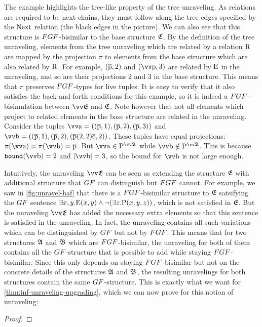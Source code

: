 \noindent
The example highlights the tree-like property of the tree unraveling.
As relations are required to be next-chains, they must follow along the tree edges specified by the $\mathrm{Next}$ relation (the black edges in the picture).
We can also see that this structure is $\FGF$-bisimilar to the base structure ${\mathfrak{E}}$.
By the definition of the tree unraveling, elements from the tree unraveling which are related by a relation $\mathrm{R}$ are mapped by the projection $\pi$ to elements from the base structure which are also related by $\mathrm{R}$.
For example, $(\overline{\mathrm{p}}, 2)$ and $(\elemtuptuplep, 3)$ are related by $\mathrm{E}$ in the unraveling, and so are their projections $2$ and $3$ in the base structure.
This means that $\pi$ preserves $\FGF$-types for live tuples.
It is easy to verify that it also satisfies the back-and-forth conditions for this example, so it is indeed a $\FGF$-bisimulation between $\unravel{E}$ and ${\mathfrak{E}}$.
Note however that not all elements which project to related elements in the base structure are related in the unraveling.
Consider the tuples $\elemtuptuplea = ((\elemtuplep, 1), (\elemtuplep, 2), (\elemtuplep, 3))$ and $\elemtuptupleb = ((\elemtuplep, 1), (\elemtuplep, 2), (\elemtuplep(2,2)\elemtuplee, 2))$.
These tuples have equal projections: $\pi(\elemtuptuplea) = \pi(\elemtuptupleb) = \elemtuplep$.
But $\elemtuptuplea \in \relP^{\unravel{A}}$ while $\elemtuptupleb \notin \relP^{\unravel{A}}$.
This is because $\mathtt{bound}(\elemtuptupleb) = 2$ and $|\elemtuptupleb| = 3$, so the bound for $\elemtuptupleb$ is not large enough.

Intuitively, the unraveling $\unravel{E}$ can be seen as extending the structure ${\mathfrak{E}}$ with additional structure that $\GF$ can distinguish but $\FGF$ cannot.
For example, we saw in \cref{fig:unravel-haf} that there is a $\FGF$-bisimilar structure to ${\mathfrak{E}}$ satsifying the $\GF$ sentence $\exists{x,y}. \mathrm{E}(x,y) \land \lnot (\exists z. \mathrm{P}(x,y,z))$, which is not satisfied in ${\mathfrak{E}}$.
But the unraveling $\unravel{E}$ has added the necessary extra elements so that this sentence is satisfied in the unraveling.
In fact, the unraveling contains all such variations which can be distinguished by $\GF$ but not by $\FGF$.
This means that for two structures ${\mathfrak{A}}$ and ${\mathfrak{B}}$ which are $\FGF$-bisimilar, the unraveling for both of them contains all the $\GF$-structure that is possible to add while staying $\FGF$-bisimilar.
Since this only depends on staying $\FGF$-bisimilar but not on the concrete details of the structures ${\mathfrak{A}}$ and ${\mathfrak{B}}$, the resulting unravelings for both structures contain the same $\GF$-structure.
This is exactly what we want for \cref{thm:inf-unraveling-upgrading}, which we can now prove for this notion of unraveling:
\begin{proof}
\end{proof}
